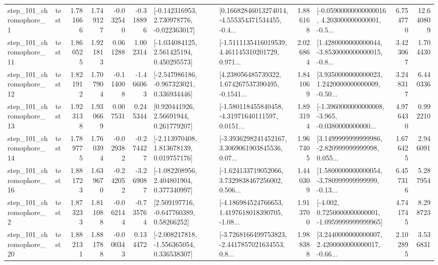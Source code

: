 \begin{tabular}{llrrrrllrlrr}
   step\_101\_chromophore\_1 &      test &      1.781666 &    1.749127 &     -0.032540 & -0.318896 &   [-0.142316953, 2.730978776, -0.022363017] &  [0.16682846013274014, -4.555354371534455, -0.4... &       1.886168 &  [-0.05900000000000016, 4.203000000000001, -0.5... &            6.754770 &         12.640809 \\
  step\_101\_chromophore\_11 &      test &      1.860525 &    1.921813 &      0.061288 &  1.002314 &    [-1.034084125, 2.561425194, 0.450295573] &  [-1.5111135416019539, 4.461145310201729, 0.971... &       2.026864 &  [1.4280000000000044, -3.8530000000000015, -0.8... &            3.423067 &          1.704430 \\
  step\_101\_chromophore\_12 &      test &      1.821912 &    1.707904 &     -0.114008 & -1.466063 &   [-2.547986186, -0.967323021, 0.336934446] &  [4.238056485739322, 1.674267537390495, -0.1541... &       1.841069 &  [3.9350000000000023, 1.2420000000000009, -0.50... &            3.248317 &          6.440336 \\
  step\_101\_chromophore\_13 &      test &      1.923138 &    1.930669 &      0.007531 &  0.245344 &      [0.920441926, 2.56691944, 0.261779207] &  [-1.580118455840458, -4.31971640111597, 0.0151... &       1.893194 &  [-1.3960000000000008, -3.965, -0.0380000000000... &            4.976430 &          0.992210 \\
  step\_101\_chromophore\_14 &      test &      1.789775 &    1.760394 &     -0.029382 & -0.274427 &    [-2.113970408, 1.813678139, 0.019757176] &  [-3.3936298241452167, 3.3069061903845536, 0.07... &       1.967405 &  [3.1499999999999986, -2.820999999999998, 0.055... &            1.676425 &          2.946091 \\
  step\_101\_chromophore\_16 &      test &      1.881723 &    1.639670 &     -0.242052 & -3.269087 &    [-1.082208956, 2.404801904, 0.377340997] &  [-1.624133719052066, 3.7329838467256002, 0.506... &       1.440309 &  [1.5800000000000054, -3.780999999999999, -0.13... &            6.457316 &          5.287954 \\
   step\_101\_chromophore\_2 &      test &      1.873233 &    1.811088 &     -0.062144 & -0.735764 &     [2.509197716, -0.647760389, 0.58266252] &  [-4.186984524766653, 1.4197618018390705, -1.08... &       1.913700 &  [-4.002, 0.7250000000000001, -1.0959999999999965] &            4.741745 &          8.298723 \\
  step\_101\_chromophore\_20 &      test &      1.882131 &    1.881788 &     -0.000343 &  0.134472 &   [-2.008217818, -1.556365054, 0.336538307] &  [-3.7268166499753823, -2.4417857021634553, 0.8... &       1.988388 &  [3.2440000000000007, 2.4200000000000017, -0.66... &            2.102895 &          3.536831 \\

\end{tabular}
